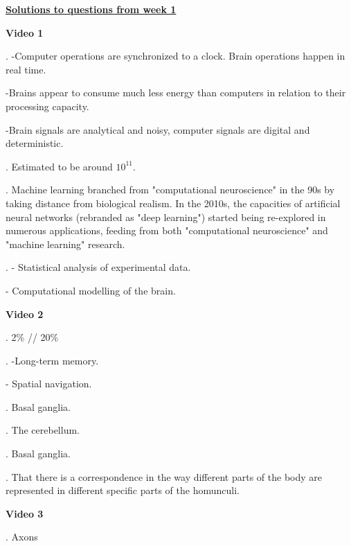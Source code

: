 \documentclass[a4paper,12pt]{article}
\begin{document}
\noindent\large\textbf{\underline{Solutions to questions from week 1}}

\vspace{0.5cm}

\noindent\normalsize\textbf{Video 1}

 

. -Computer operations are synchronized to a clock. Brain operations happen in real time. 

-Brains appear to consume much less energy than computers in relation to their processing capacity. 

-Brain signals are analytical and noisy, computer signals are digital and deterministic.


. Estimated to be around $10^{11}$.

. Machine learning branched from "computational neuroscience" in the 90s by taking distance from biological realism. In the 2010s, the capacities of artificial neural networks (rebranded as "deep learning") started being re-explored in numerous applications, feeding from both "computational neuroscience" and "machine learning" research.

. - Statistical analysis of experimental data.

- Computational modelling of the brain.

\vspace{0.5cm}

\noindent\normalsize\textbf{Video 2}

. 2\% // 20\%

. -Long-term memory.

- Spatial navigation.

. Basal ganglia.

. The cerebellum.

. Basal ganglia.

. That there is a correspondence in the way different parts of the body are represented in different specific parts of the homunculi.


\vspace{0.5cm}

\noindent\normalsize\textbf{Video 3}

. Axons
\end{document}
